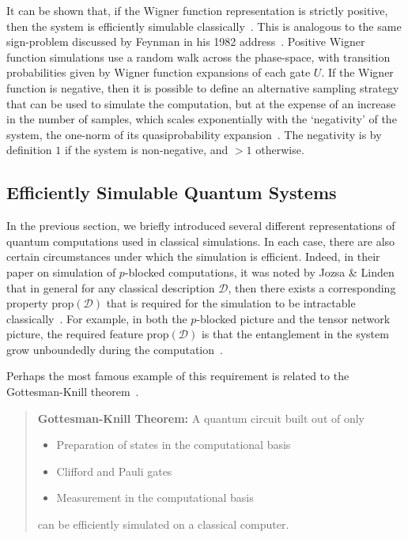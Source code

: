 It can be shown that, if the Wigner function representation is strictly positive, then the system is efficiently simulable classically~\cite{Bartlett2002,Mari2012}. This is analogous to the same sign-problem discussed by Feynman in his 1982 address~\cite{Feynman1982}. Positive Wigner function simulations use a random walk across the phase-space, with transition probabilities given by Wigner function expansions of each gate $U$. If the Wigner function is negative, then it is possible to define an alternative sampling strategy that can be used to simulate the computation, but at the expense of an increase in the number of samples, which scales exponentially with the `negativity' of the system, the one-norm of its quasiprobability expansion~\cite{Pashayan2015}. The negativity is by definition $1$ if the system is non-negative, and $>1$ otherwise.
\subsection{Efficiently Simulable Quantum Systems}\label{sec:intro_efficient_simulations}
In the previous section, we briefly introduced several different representations of quantum computations used in classical simulations. In each case, there are also certain circumstances under which the simulation is efficient. Indeed, in their paper on simulation of $p$-blocked computations, it was noted by Jozsa \& Linden that in general for any classical description $\mathcal{D}$, then there exists a corresponding property $\text{prop}\left(\mathcal{D}\right)$ that is required for the simulation to be intractable classically~\cite{Jozsa2003}. For example, in both the $p$-blocked picture and the tensor network picture, the required feature $\text{prop}\left(\mathcal{D}\right)$ is that the entanglement in the system grow unboundedly during the computation~\cite{Jozsa2003,Vidal2003}.\par
Perhaps the most famous example of this requirement is related to the Gottesman-Knill theorem~\cite{Jozsa2003,Gottesman1998b}.
\begin{quote}
\textbf{Gottesman-Knill Theorem:} A quantum circuit built out of only 
\begin{itemize}
    \item Preparation of states in the computational basis
    \item Clifford and Pauli gates
    \item Measurement in the computational basis
\end{itemize}
can be efficiently simulated on a classical computer.
\end{quote}
